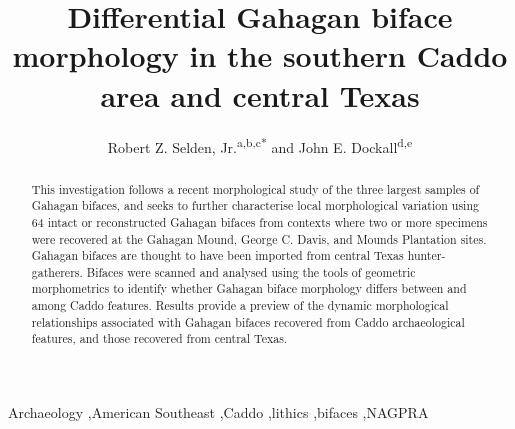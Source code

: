 \documentclass[review]{elsarticle}
\begin{document}
\begin{frontmatter}


\title{Differential Gahagan biface morphology in the southern Caddo area and central Texas}



\author{Robert Z. Selden, Jr.\textsuperscript{a,b,c*} and John E. Dockall\textsuperscript{d,e}}
\address[1]{Heritage Research Center, Stephen F. Austin State University, United States}
\address[2]{Cultural Heritage Department, Jean Monnet University, France}
\address[3]{ORCID ID \href{http://orcid.org/0000-0002-1789-8449}{0000-0002-1789-8449}}
\address[4]{Prewitt and Associates, Inc., United States}
\address[5]{ORCID ID \href{http://orcid.org/0000-0002-0940-7144}{0000-0002-0940-7144}}

\begin{abstract}
This investigation follows a recent morphological study of the three largest samples of Gahagan bifaces, and seeks to further characterise local morphological variation using 64 intact or reconstructed Gahagan bifaces from contexts where two or more specimens were recovered at the Gahagan Mound, George C. Davis, and Mounds Plantation sites. Gahagan bifaces are thought to have been imported from central Texas hunter-gatherers. Bifaces were scanned and analysed using the tools of geometric morphometrics to identify whether Gahagan biface morphology differs between and among Caddo features. Results provide a preview of the dynamic morphological relationships associated with Gahagan bifaces recovered from Caddo archaeological features, and those recovered from central Texas.
\end{abstract}

\begin{keyword}
Archaeology \sep American Southeast \sep Caddo \sep lithics \sep bifaces \sep NAGPRA
\end{keyword}

\end{frontmatter}
\end{document}
